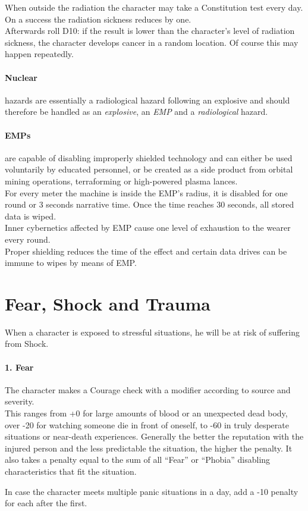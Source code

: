 \documentclass[12pt,a4paper,openany,dvipsnames]{book}
\begin{document}
	\par
	When outside the radiation the character may take a Constitution test every day. On a success the radiation sickness reduces by one.\\
	Afterwards roll D10: if the result is lower than the character's level of radiation sickness, the character develops cancer in a random location.
	Of course this may happen repeatedly.
	\paragraph{Nuclear} hazards are essentially a radiological hazard following an explosive and should therefore be handled as an \emph{explosive}, an \emph{EMP} and a \emph{radiological} hazard.
	\paragraph{EMPs} are capable of disabling improperly shielded technology and can either be used voluntarily by educated personnel, or be created as a side product from orbital mining operations, terraforming or high-powered plasma lances.\\
	For every meter the machine is inside the EMP’s radius, it is disabled for one round or 3 seconds narrative time. Once the time reaches 30 seconds, all stored data is wiped.\\
	Inner cybernetics affected by EMP cause one level of exhaustion to the wearer every round.\\
	Proper shielding reduces the time of the effect and certain data drives can be immune to wipes by means of EMP.
%
	\section{Fear, Shock and Trauma}
	When a character is exposed to stressful situations, he will be at risk of suffering from Shock.
	\\%
	\paragraph{1. Fear}
	The character makes a Courage check with a modifier according to source and severity.\\
	This ranges from +0 for large amounts of blood or an unexpected dead body, over -20 for watching someone die in front of oneself, to -60 in truly desperate situations or near-death experiences.
	Generally the better the reputation with the injured person and the less predictable the situation, the higher the penalty. It also takes a penalty equal to the sum of all “Fear” or “Phobia” disabling characteristics that fit the situation.
	\par \vspace{-5mm}
	In case the character meets multiple panic situations in a day, add a -10 penalty for each after the first.
\end{document}
